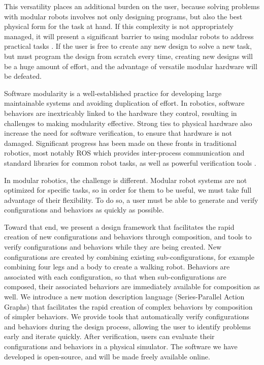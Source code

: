 \documentclass[graybox]{svmult}
\begin{document}
This versatility places an additional burden on the user, because
solving problems with modular robots involves not only designing  programs,
but also the best physical form for the task at hand. If this
complexity is not appropriately managed, it will present a significant barrier to
using modular robots to address practical tasks \cite{yim2000modular}. If the user is free to create any new design to
solve a new task, but must program the design from scratch every time, creating
new designs will be a huge amount of effort, and the advantage of versatile modular
hardware will be defeated.

Software modularity is a well-established practice for developing large
maintainable systems and avoiding duplication of effort. In robotics, software
behaviors are inextricably linked to the hardware they control, resulting in challenges to making modularity effective. Strong
ties to physical hardware also increase the need for software verification, to ensure
that hardware is not damaged. Significant progress has been made on these fronts
in traditional robotics, most notably
ROS \cite{Quigley2009} which provides inter-process communication and standard libraries for common robot tasks,
as well as powerful verification tools \cite{huang2014rosrv}.
  
In modular robotics, the challenge is different.  Modular robot systems are not optimized
for specific tasks, so in order for them to be useful, we must take full advantage of their flexibility. To do
so, a user must be able to generate and verify configurations and behaviors
as quickly as possible.  

Toward that end, we present a design framework that facilitates the rapid creation
of new configurations
and behaviors through composition, and tools to verify configurations and behaviors
while they are being created. New configurations are created by combining existing
sub-configurations,
for example combining four legs and a body to create a walking robot.
Behaviors are associated with each configuration, so that when sub-configurations
are composed, their associated behaviors are immediately available for composition
as well.
We introduce a new motion description language (Series-Parallel Action Graphs)
that facilitates the rapid creation of complex behaviors by composition of simpler
behaviors.
We provide tools that automatically verify configurations and behaviors during the
design process, allowing the user to identify problems early and iterate quickly.
After verification, users can  evaluate their configurations and behaviors in a physical simulator.
The software we have developed is open-source, and will be made freely available
online.
\end{document}
